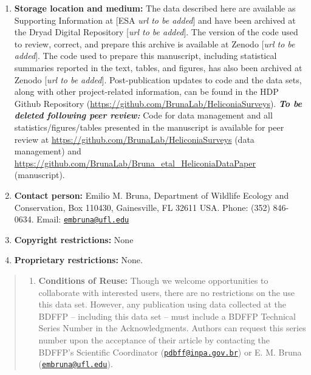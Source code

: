 \documentclass[
  man, donotrepeattitle,floatsintext]{apa6}
\providecommand{\tightlist}{%
  \setlength{\itemsep}{0pt}\setlength{\parskip}{0pt}}
\begin{document}
\begin{enumerate}
\def\labelenumi{\arabic{enumi}.}
\item
  \textbf{Storage location and medium:} The data described here are available as Supporting Information at {[}ESA \emph{url to be added}{]} and have been archived at the Dryad Digital Repository {[}\emph{url to be added}{]}. The version of the code used to review, correct, and prepare this archive is available at Zenodo {[}\emph{url to be added}{]}. The code used to prepare this manuscript, including statistical summaries reported in the text, tables, and figures, has also been archived at Zenodo {[}\emph{url to be added}{]}. Post-publication updates to code and the data sets, along with other project-related information, can be found in the HDP Github Repository (\url{https://github.com/BrunaLab/HeliconiaSurveys}). \textbf{\emph{To be deleted following peer review:}} Code for data management and all statistics/figures/tables presented in the manuscript is available for peer review at \url{https://github.com/BrunaLab/HeliconiaSurveys} (data management) and \url{https://github.com/BrunaLab/Bruna_etal_HeliconiaDataPaper} (manuscript).
\item
  \textbf{Contact person:} Emilio M. Bruna, Department of Wildlife Ecology and Conservation, Box 110430, Gainesville, FL 32611 USA. Phone: (352) 846-0634. Email: \href{mailto:embruna@ufl.edu}{\nolinkurl{embruna@ufl.edu}}
\item
  \textbf{Copyright restrictions:} None
\item
  \textbf{Proprietary restrictions:} None.
\end{enumerate}

\begin{quote}
\begin{enumerate}
\def\labelenumi{\alph{enumi}.}
\tightlist
\item
  \textbf{Conditions of Reuse:} Though we welcome opportunities to collaborate with interested users, there are no restrictions on the use this data set. However, any publication using data collected at the BDFFP -- including this data set -- must include a BDFFP Technical Series Number in the Acknowledgments. Authors can request this series number upon the acceptance of their article by contacting the BDFFP's Scientific Coordinator (\href{mailto:pdbff@inpa.gov.br}{\nolinkurl{pdbff@inpa.gov.br}}) or E. M. Bruna (\href{mailto:embruna@ufl.edu}{\nolinkurl{embruna@ufl.edu}}).
\end{enumerate}
\end{quote}
\end{document}
